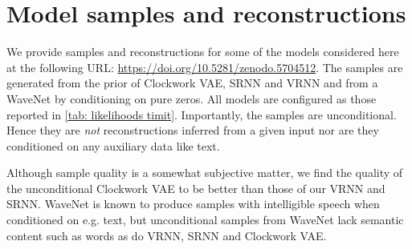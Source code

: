 \section{Model samples and reconstructions}\label{app: model samples and reconstructions}
We provide samples and reconstructions for some of the models considered here at the following URL: \url{https://doi.org/10.5281/zenodo.5704512}.
The samples are generated from the prior of Clockwork VAE, SRNN and VRNN and from a WaveNet by conditioning on pure zeros. All models are configured as those reported in \cref{tab: likelihoods timit}.
Importantly, the samples are unconditional. Hence they are \emph{not} reconstructions inferred from a given input nor are they conditioned on any auxiliary data like text.

Although sample quality is a somewhat subjective matter, we find the quality of the unconditional Clockwork VAE to be better than those of our VRNN and SRNN. WaveNet is known to produce samples with intelligible speech when conditioned on e.g. text, but unconditional samples from WaveNet lack semantic content such as words as do VRNN, SRNN and Clockwork VAE.

\fi